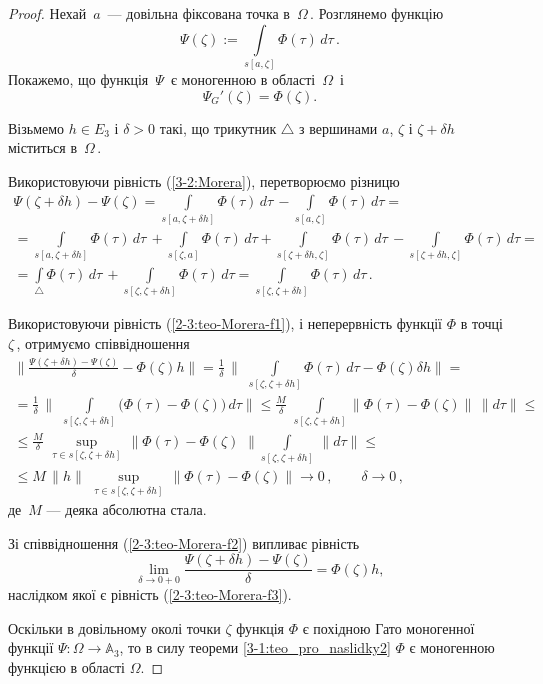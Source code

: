 \documentclass[11pt, reqno]{amsart}
\begin{document}
\begin{proof}
Нехай\, $a$\, --- довільна фіксована точка в\, $\Omega$\,.
Розглянемо функцію
\[\Psi(\zeta):=\int\limits_{s[a,\zeta]}\Phi(\tau)\,d\tau\,.\]
Покажемо, що функція\, $\Psi$\, є моногенною в області\, $\Omega$\, і
\begin{equation}\label{2-3:teo-Morera-f3}
\Psi_G'(\zeta)=\Phi(\zeta).
\end{equation}

Візьмемо $h\in E_3$ і $\delta>0$ такі, що трикутник
$\triangle$ з вершинами $a$, $\zeta$ і $\zeta+\delta h$ міститься в\, $\Omega$\,.

Використовуючи рівність (\ref{3-2:Morera}), перетворюємо різницю
\begin{multline}\label{2-3:teo-Morera-f1}
\Psi(\zeta+\delta h)-\Psi(\zeta)=\int\limits_{s[a, \zeta+\delta h]}\Phi(\tau)\,d\tau\,-
\int\limits_{s[a,\zeta]}\Phi(\tau)\,d\tau=\\[1mm]
=\int\limits_{s[a, \zeta+\delta h]}\Phi(\tau)\,d\tau\,+
\int\limits_{s[\zeta,a]}\Phi(\tau)\,d\tau+\int\limits_{s[\zeta+\delta h,
\zeta]}\Phi(\tau)\,d\tau\,-\int\limits_{s[\zeta+\delta h, \zeta]}\Phi(\tau)\,d\tau=\\[1mm]
=\int\limits_{\triangle}\Phi(\tau)\,d\tau\,+\int\limits_{s[\zeta,
\zeta+\delta h]}\Phi(\tau)\,d\tau=\int\limits_{s[\zeta,
\zeta+\delta h]}\Phi(\tau)\,d\tau\,.
\end{multline}

Використовуючи рівність (\ref{2-3:teo-Morera-f1}), і неперервність функції
$\Phi$ в точці $\zeta$\,, отримуємо співвідношення
\begin{multline}\label{2-3:teo-Morera-f2}
\Biggr\|\frac{\Psi(\zeta+\delta h)-\Psi(\zeta)}{\delta}-\Phi(\zeta)h\Biggr\|=
\frac{1}{\delta}\,\Biggr\|\,\,\int\limits_{s[\zeta,\zeta+\delta h]}\Phi(\tau)\,d\tau-\Phi(\zeta) \delta h\Biggr\|=\\[1.5mm]
=\frac{1}{\delta}\,\Biggr\|\,\,\int\limits_{s[\zeta,
\zeta+\delta
h]}\Big(\Phi(\tau)-\Phi(\zeta)\Big)\,d\tau\Biggr\|\leq\frac{M}{\delta}\,\,\int\limits_{s[\zeta,
\zeta+\delta h]}\|\Phi(\tau)-\Phi(\zeta)\|\,\|d\tau\|\le\\[1.5mm]
\leq\frac{M}{\delta}\,\,\sup\limits_{\tau\in s[\zeta,\zeta+\delta h]}\,\|\Phi(\tau)-\Phi(\zeta)\,\,\|\int\limits_{s[\zeta,
\zeta+\delta h]}\,\|d\tau\|\leq\\[1.5mm]
\leq M\,\|h\|\,\,\sup\limits_{\tau\in s[\zeta,\zeta+\delta h]}\,\|\Phi(\tau)-\Phi(\zeta)\|\rightarrow 0\,,\qquad
\delta\rightarrow 0\,,
\end{multline}
де\, $M$ --- деяка абсолютна стала.

Зі співвідношення (\ref{2-3:teo-Morera-f2}) випливає рівність
\[\lim\limits_{\delta\rightarrow0+0}\frac{\Psi(\zeta+\delta h)-\Psi(\zeta)}{\delta}=\Phi(\zeta)h,\]
наслідком якої є рівність (\ref{2-3:teo-Morera-f3}).

Оскільки в довільному околі точки $\zeta$ функція $\Phi$ є похідною Гато моногенної функції
$\Psi : \Omega\rightarrow\mathbb{A}_{3}$, то в силу теореми \ref{3-1:teo_pro_naslidky2} $\Phi$
є моногенною функцією в області $\Omega$.
\end{proof}
\end{document}
